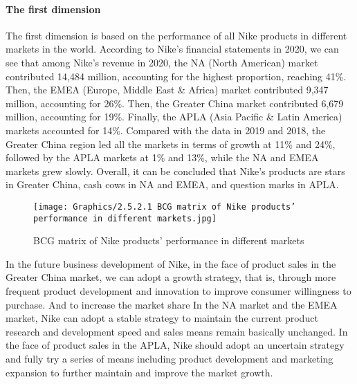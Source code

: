 \documentclass[a4paper, 12pt]{report}
\begin{document}
\paragraph{The first dimension}
The first dimension is based on the performance of all Nike products in different markets in the world. According to Nike's financial statements in 2020, we can see that among Nike's revenue in 2020, the NA (North American) market contributed 14,484 million, accounting for the highest proportion, reaching 41\%. Then, the EMEA (Europe, Middle  East \& Africa) market contributed 9,347 million, accounting for 26\%. Then, the Greater China market contributed 6,679 million, accounting for 19\%. Finally, the APLA (Asia Pacific & Latin America) markets accounted for 14\%. Compared with the data in 2019 and 2018, the Greater China region led all the markets in terms of growth at 11\% and 24\%, followed by the APLA markets at 1\% and 13\%, while the NA and EMEA markets grew slowly. Overall, it can be concluded that Nike's products are stars in Greater China, cash cows in NA and EMEA, and question marks in APLA. 
 \begin{figure}[ht]
 			\begin{center}
				\texttt{[image: Graphics/2.5.2.1 BCG matrix of Nike products' performance in different markets.jpg]} 
			\end{center}
       		\caption{\label{2.5.2.1.2}BCG matrix of Nike products' performance in different markets}
 \end{figure}
In the future business development of Nike, in the face of product sales in the Greater China market, we can adopt a growth strategy, that is, through more frequent product development and innovation to improve consumer willingness to purchase. And to increase the market share In the NA market and the EMEA market, Nike can adopt a stable strategy to maintain the current product research and development speed and sales means remain basically unchanged. In the face of product sales in the APLA, Nike should adopt an uncertain strategy and fully try a series of means including product development and marketing expansion to further maintain and improve the market growth.
\end{document}
